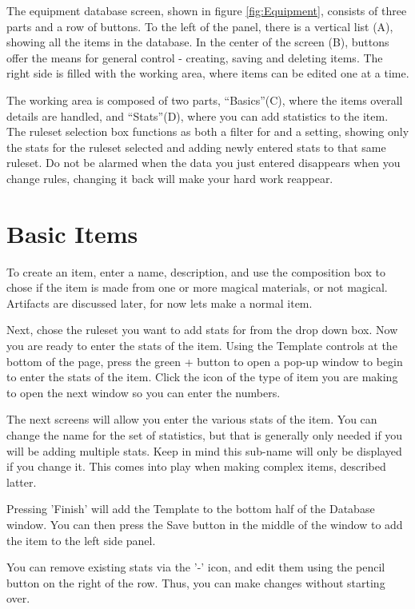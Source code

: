 The equipment database screen, shown in figure \ref{fig:Equipment}, consists of three parts and a row of buttons. To the left of the panel, there is a vertical list (A), showing all the items in the database. In the center of the screen (B), buttons offer the means for general control - creating, saving and deleting items. The right side is filled with the working area, where items can be edited one at a time.

The working area is composed of two parts, "`Basics"'(C), where the items overall details are handled, and "`Stats"'(D), where you can add statistics to the item. The ruleset selection box functions as both a filter for and a setting, showing only the stats for the ruleset selected and adding newly entered stats to that same ruleset. Do not be alarmed when the data you just entered disappears when you change rules, changing it back will make your hard work reappear.

\section{Basic Items}
To create an item, enter a name, description, and use the composition box to chose if the item is made from one or more magical materials, or not magical.  Artifacts are discussed later, for now lets make a normal item.

Next, chose the ruleset you want to add stats for from the drop down box. Now you are ready to enter the stats of the item.  Using the Template controls at the bottom of the page, press the green + button to open a pop-up window to begin to enter the stats of the item.  Click the icon of the type of item you are making to open the next window so you can enter the numbers.

The next screens will allow you enter the various stats of the item.  You can change the name for the set of statistics, but that is generally only needed if you  will be adding multiple stats. Keep in mind this sub-name will only be displayed if you change it. This comes into play when making complex items, described latter.

Pressing 'Finish' will add the Template to the bottom half of the Database window.
You can then press the Save button in the middle of the window to add the item to the left side panel.  

You can remove existing stats via the '-' icon, and edit them using the pencil button on the right of the row. Thus, you can make changes without starting over.

